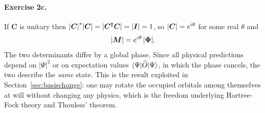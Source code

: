 \paragraph{Exercise 2c.}
If $\bm{C}$ is unitary then ${|\boldsymbol{C}|}^{*}{|\boldsymbol{C}|}={|\boldsymbol{C^{\dagger}C}|}={|\boldsymbol{I}|}=1$,
so ${|\boldsymbol{C}|}=e^{i\theta}$ for some real $\theta$ and
\begin{equation}
  {|\boldsymbol{M}|} = e^{i\theta}\,{|\boldsymbol{\Phi}|} .
  \label{eq:1-w34c2}
\end{equation}
The two determinants differ by a global phase.  Since all physical
predictions depend on $|\Psi|^2$ or on expectation values
$\langle \Psi | \widehat{O} | \Psi \rangle$, in which the phase cancels, the two describe
the \emph{same} state.  This is the result exploited in
Section~\ref{sec:basischange}: one may rotate the occupied orbitals among
themselves at will without changing any physics, which is the freedom
underlying Hartree-Fock theory and Thouless' theorem.
